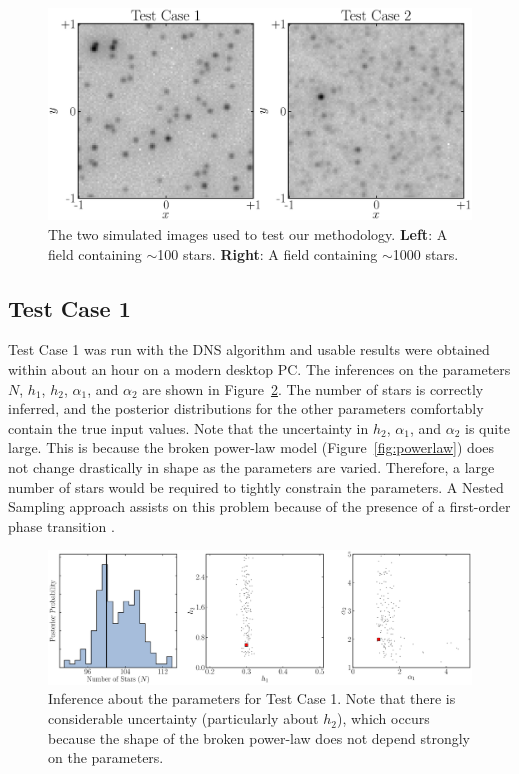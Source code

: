 \documentclass[manuscript]{aastex}
\begin{document}
\begin{figure}
\begin{center}
\includegraphics[width=\textwidth]{Figures/test_cases.eps}
\caption{The two simulated images used to test our methodology.
{\bf Left}: A field containing $\sim$100 stars.
{\bf Right}: A field containing $\sim$1000 stars.\label{fig:simulated_data}}
\end{center}
\end{figure}

\subsection{Test Case 1}
Test Case 1 was run with the DNS algorithm and usable results were obtained
within about an hour on a modern desktop PC. The inferences on the parameters
$N$, $h_1$, $h_2$, $\alpha_1$, and $\alpha_2$ are shown in
Figure~\ref{fig:results1}. The number of stars is correctly inferred, and the
posterior distributions for the other parameters comfortably contain the true
input values. Note that the uncertainty in $h_2$, $\alpha_1$, and $\alpha_2$ is
quite large. This is because the broken power-law model
(Figure~\ref{fig:powerlaw}) does not change drastically in shape as the
parameters are varied. Therefore, a large number of stars would be required to
tightly constrain the parameters. A Nested Sampling approach assists on
this problem because of the presence of a first-order phase transition
\citep{skilling}.

\begin{figure}
\begin{center}
\includegraphics[width=\textwidth]{Figures/inference1.eps}
\end{center}
\caption{Inference about the parameters for Test Case 1. Note that there is
considerable uncertainty (particularly about $h_2$), which occurs because the
shape of the broken power-law does not depend strongly on the parameters.
\label{fig:results1}}
\end{figure}
\end{document}
